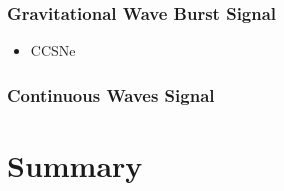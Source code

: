 	\subsubsection{Gravitational Wave Burst Signal}
		\begin{itemize}
			\item CCSNe
		\end{itemize}
	\subsubsection{Continuous Waves Signal}




\subsection{}
\section{Summary}


